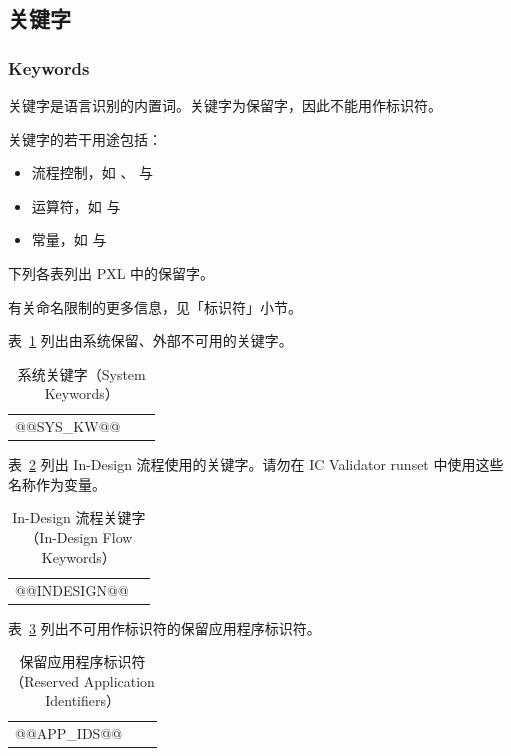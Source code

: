 \subsection{关键字}
\subsubsection*{Keywords}
\label{sec:pxl-keywords}

关键字是语言识别的内置词。关键字为保留字，因此不能用作标识符。

关键字的若干用途包括：
\begin{itemize}
  \item 流程控制，如 、 与 
  \item 运算符，如  与 
  \item 常量，如  与 
\end{itemize}

下列各表列出 PXL 中的保留字。

\begin{noteBox}
有关命名限制的更多信息，见「标识符」小节。
\end{noteBox}

表~\ref{tab:pxl-sys-kw} 列出由系统保留、外部不可用的关键字。

\begin{longtable}{@{}>{\raggedright\arraybackslash\ttfamily}p{} >{\raggedright\arraybackslash\ttfamily}p{} >{\raggedright\arraybackslash\ttfamily}p{}@{}}
\caption{系统关键字（System Keywords）}\label{tab:pxl-sys-kw}\\
\toprule
\endfirsthead
\endhead
\bottomrule
\endfoot
@@SYS_KW@@
\end{longtable}

表~\ref{tab:pxl-indesign-kw} 列出 In-Design 流程使用的关键字。请勿在 IC Validator runset 中使用这些名称作为变量。

\begin{longtable}{@{}>{\raggedright\arraybackslash\ttfamily}p{} >{\raggedright\arraybackslash\ttfamily}p{}@{}}
\caption{In-Design 流程关键字（In-Design Flow Keywords）}\label{tab:pxl-indesign-kw}\\
\toprule
\endfirsthead
\endhead
\bottomrule
\endfoot
@@INDESIGN@@
\end{longtable}

表~\ref{tab:pxl-app-ids} 列出不可用作标识符的保留应用程序标识符。

\begin{longtable}{@{}>{\raggedright\arraybackslash\ttfamily}p{} >{\raggedright\arraybackslash\ttfamily}p{} >{\raggedright\arraybackslash\ttfamily}p{}@{}}
\caption{保留应用程序标识符（Reserved Application Identifiers）}\label{tab:pxl-app-ids}\\
\toprule
\endfirsthead
\endhead
\bottomrule
\endfoot
@@APP_IDS@@
\end{longtable}


